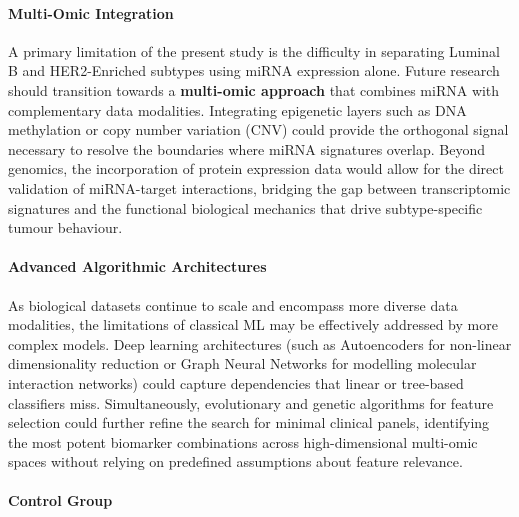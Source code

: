 \paragraph{Multi-Omic Integration}
\label{subsec:future_multiomics}

A primary limitation of the present study is the difficulty in separating
Luminal B and HER2-Enriched subtypes using miRNA expression alone. Future
research should transition towards a \textbf{multi-omic approach} that
combines miRNA with complementary data modalities. Integrating epigenetic
layers such as DNA methylation or copy number variation (CNV) could provide
the orthogonal signal necessary to resolve the boundaries where miRNA
signatures overlap. Beyond genomics, the incorporation of protein expression
data would allow for the direct validation of miRNA-target interactions,
bridging the gap between transcriptomic signatures and the functional
biological mechanics that drive subtype-specific tumour behaviour.

\paragraph{Advanced Algorithmic Architectures}

As biological datasets continue to scale and encompass more diverse data
modalities, the limitations of classical ML may be effectively addressed by
more complex models. Deep learning architectures (such as Autoencoders for
non-linear dimensionality reduction or Graph Neural Networks for modelling
molecular interaction networks) could capture dependencies that linear or
tree-based classifiers miss. Simultaneously, evolutionary and genetic algorithms
for feature selection could further refine the search for minimal clinical
panels, identifying the most potent biomarker combinations across
high-dimensional multi-omic spaces without relying on predefined assumptions
about feature relevance.

\paragraph{Control Group}

